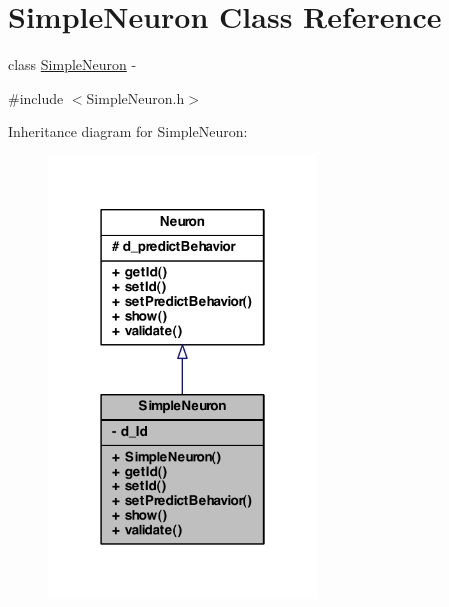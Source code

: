 \hypertarget{class_simple_neuron}{
\section{SimpleNeuron Class Reference}
\label{class_simple_neuron}
}


class \hyperlink{class_simple_neuron}{SimpleNeuron} -\/  




{\ttfamily \#include $<$SimpleNeuron.h$>$}



Inheritance diagram for SimpleNeuron:
\nopagebreak
\begin{figure}[H]
\begin{center}
\leavevmode
\includegraphics[width=202pt]{class_simple_neuron__inherit__graph}
\end{center}
\end{figure}


